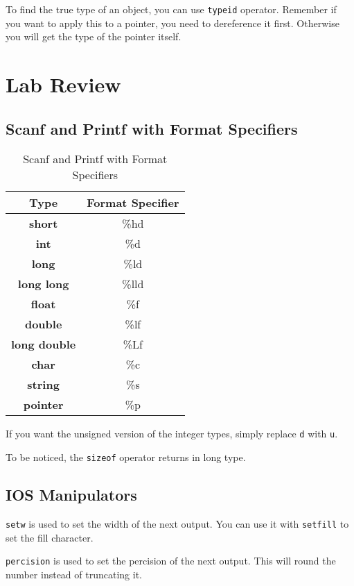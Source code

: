 \documentclass[a4paper,12pt]{article}
\begin{document}
To find the true type of an object, you can use \texttt{typeid} operator.
Remember if you want to apply this to a pointer, you need to dereference it first.
Otherwise you will get the type of the pointer itself.
\newpage
\section{Lab Review}

\subsection{Scanf and Printf with Format Specifiers}

\begin{table}[H]
	\centering
	\begin{tabular}{|c|c|}
		\hline
		Type & Format Specifier \\
		\hline
		\textbf{short} & \%hd \\
		\hline
		\textbf{int} & \%d \\
		\hline
		\textbf{long} & \%ld \\
		\hline
		\textbf{long long} & \%lld \\
		\hline
		\textbf{float} & \%f \\
		\hline
		\textbf{double} & \%lf \\
		\hline
		\textbf{long double} & \%Lf \\
		\hline
		\textbf{char} & \%c \\
		\hline
		\textbf{string} & \%s \\
		\hline
		\textbf{pointer} & \%p \\
		\hline
	\end{tabular}
	\caption{Scanf and Printf with Format Specifiers}
\end{table}

If you want the unsigned version of the integer types, simply replace \texttt{d} with \texttt{u}.

To be noticed, the \texttt{sizeof} operator returns in long type.

\subsection{IOS Manipulators}

\texttt{setw} is used to set the width of the next output.
You can use it with \texttt{setfill} to set the fill character.

\texttt{percision} is used to set the percision of the next output.
This will round the number instead of truncating it.
\end{document}
